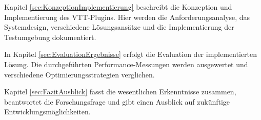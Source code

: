 Kapitel \autoref{sec:KonzeptionImplementierung} beschreibt die Konzeption und Implementierung des VTT-Plugins. Hier werden die Anforderungsanalyse, das Systemdesign, verschiedene Lösungsansätze und die Implementierung der Testumgebung dokumentiert.

In Kapitel \autoref{sec:EvaluationErgebnisse} erfolgt die Evaluation der implementierten Lösung. Die durchgeführten Performance-Messungen werden ausgewertet und verschiedene Optimierungsstrategien verglichen.

Kapitel \autoref{sec:FazitAusblick} fasst die wesentlichen Erkenntnisse zusammen, beantwortet die Forschungsfrage und gibt einen Ausblick auf zukünftige Entwicklungsmöglichkeiten.